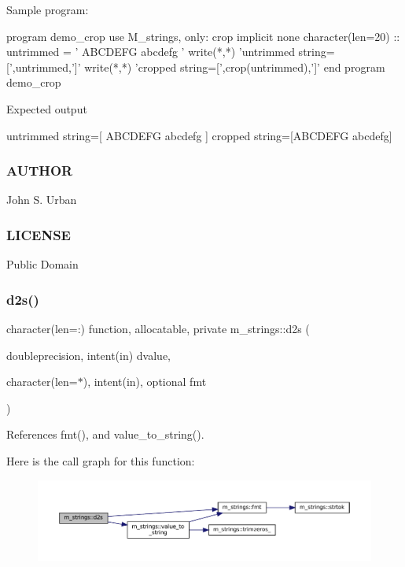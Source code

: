 Sample program\+: \begin{DoxyVerb}program demo_crop
use M_strings, only: crop
implicit none
character(len=20) ::  untrimmed = '   ABCDEFG abcdefg  '
   write(*,*) 'untrimmed string=[',untrimmed,']'
   write(*,*) 'cropped string=[',crop(untrimmed),']'
end program demo_crop
\end{DoxyVerb}


Expected output \begin{DoxyVerb}untrimmed string=[   ABCDEFG abcdefg                      ]
cropped string=[ABCDEFG abcdefg]
\end{DoxyVerb}
 \subsubsection*{A\+U\+T\+H\+OR}

John S. Urban \subsubsection*{L\+I\+C\+E\+N\+SE}

Public Domain \mbox{\label{namespacem__strings_a14715e071aea9030b4c68c22fa5a455d}} 
\subsubsection{\texorpdfstring{d2s()}{d2s()}}
{\footnotesize\ttfamily character(len=\+:) function, allocatable, private m\+\_\+strings\+::d2s (\begin{DoxyParamCaption}\item[{doubleprecision, intent(in)}]{dvalue,  }\item[{character(len=$\ast$), intent(in), optional}]{fmt }\end{DoxyParamCaption})\hspace{0.3cm}{\ttfamily [private]}}



References fmt(), and value\+\_\+to\+\_\+string().

Here is the call graph for this function\+:\nopagebreak
\begin{figure}[H]
\begin{center}
\leavevmode
\includegraphics[width=350pt]{namespacem__strings_a14715e071aea9030b4c68c22fa5a455d_cgraph}
\end{center}
\end{figure}
\mbox{\label{namespacem__strings_a970d99e3a2ab426bb90d6ea90bcc588a}} 
